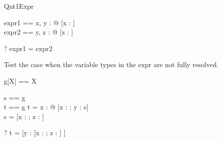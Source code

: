 \begin{zsection}
  \SECTION Qnt1Expr
\end{zsection}

\begin{zed}
  expr1 == \exists x, y : \nat @ [x : \nat]\\
  expr2 == \exists y, z : \nat @ [z : \nat]\\
\end{zed}

\begin{zed} \vdash? expr1 = expr2 \end{zed}

Test the case when the variable types in the expr are not fully 
resolved.
\begin{zed}
  g[X] == X
\end{zed}

\begin{axdef}
  s == g\\
  t == g
\where
  t = \exists x : \nat @ [x : \nat; y : s]\\
  s = [x : \nat; z : \power \nat]
\end{axdef}

\begin{zed} \vdash? t = [y : [x : \nat; z : \power \nat] ] \end{zed}
